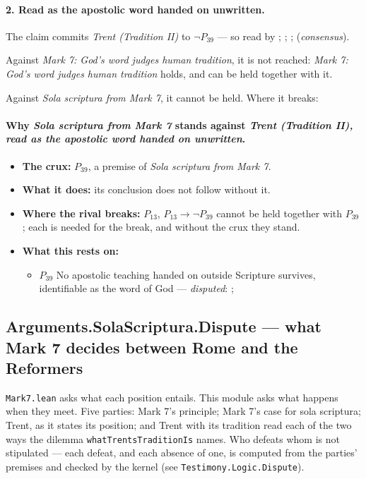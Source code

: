 \documentclass[11pt]{article}
\begin{document}
\paragraph{2. Read as the apostolic word handed on unwritten.} The claim commits \emph{Trent (Tradition II)} to \(\lnot P_{39}\) --- so read by \cite[18]{waterworth-trent-1848}; \cite[Trent, Session IV (1546), Decree on Sacred Books and Traditions]{tanner-decrees-1990}; \cite[Vatican II (1965), Dei Verbum 9]{tanner-decrees-1990}; \cite[83]{catholic-church-catechism-2000} (\emph{consensus}).

Against \emph{Mark 7: God's word judges human tradition}, it is not reached: \emph{Mark 7: God's word judges human tradition} holds, and can be held together with it.

Against \emph{Sola scriptura from Mark 7}, it cannot be held. Where it breaks:
\paragraph{Why \emph{Sola scriptura from Mark 7} stands against \emph{Trent (Tradition II), read as the apostolic word handed on unwritten}.}
\begin{itemize}
\item \textbf{The crux:} \(P_{39}\), a premise of \emph{Sola scriptura from Mark 7}.
\item \textbf{What it does:} its conclusion does not follow without it.
\item \textbf{Where the rival breaks:} \(P_{13}\), \(P_{13} \rightarrow \lnot P_{39}\) cannot be held together with \(P_{39}\); each is needed for the break, and without the crux they stand.
\item \textbf{What this rests on:}
\begin{itemize}
\item \(P_{39}\) No apostolic teaching handed on outside Scripture survives, identifiable as the word of God --- \emph{disputed}: \cite[506]{whitaker-disputation-1849}; \cite[I.6]{westminster-confession-1647}
\end{itemize}
\end{itemize}
\subsection*{Arguments.SolaScriptura.Dispute — what Mark 7 decides between Rome and the Reformers}
\texttt{Mark7.lean} asks what each position entails. This module asks what happens when they meet. Five parties: Mark 7's principle; Mark 7's case for sola scriptura; Trent, as it states its position; and Trent with its tradition read each of the two ways the dilemma \texttt{what\allowbreak{}Trents\allowbreak{}Tradition\allowbreak{}Is} names. Who defeats whom is not stipulated — each defeat, and each absence of one, is computed from the parties' premises and checked by the kernel (see \texttt{Testimony.Logic.Dispute}).
\end{document}
